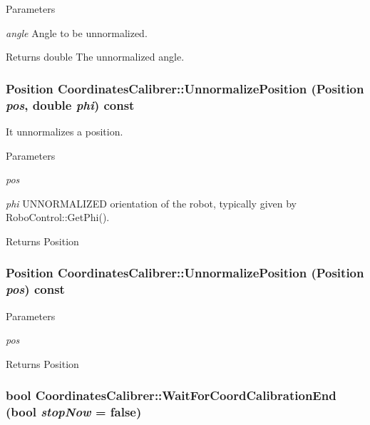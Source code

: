 \begin{DoxyParams}{Parameters}
\item[{\em angle}]Angle to be unnormalized. \end{DoxyParams}
\begin{DoxyReturn}{Returns}
double The unnormalized angle. 
\end{DoxyReturn}
\hypertarget{classCoordinatesCalibrer_a19035a69d4d571e5e1d4baa4ba10baee}{
\subsubsection[{UnnormalizePosition}]{\setlength{\rightskip}{0pt plus 5cm}Position CoordinatesCalibrer::UnnormalizePosition (Position {\em pos}, \/  double {\em phi}) const}}
\label{classCoordinatesCalibrer_a19035a69d4d571e5e1d4baa4ba10baee}


It unnormalizes a position. 


\begin{DoxyParams}{Parameters}
\item[{\em pos}]\item[{\em phi}]UNNORMALIZED orientation of the robot, typically given by RoboControl::GetPhi(). \end{DoxyParams}
\begin{DoxyReturn}{Returns}
Position 
\end{DoxyReturn}
\hypertarget{classCoordinatesCalibrer_a8522193b13196313d001c589e7845bd3}{
\subsubsection[{UnnormalizePosition}]{\setlength{\rightskip}{0pt plus 5cm}Position CoordinatesCalibrer::UnnormalizePosition (Position {\em pos}) const}}
\label{classCoordinatesCalibrer_a8522193b13196313d001c589e7845bd3}

\begin{DoxyParams}{Parameters}
\item[{\em pos}]\end{DoxyParams}
\begin{DoxyReturn}{Returns}
Position 
\end{DoxyReturn}
\hypertarget{classCoordinatesCalibrer_a99563ba6e43f839bf1b10f55cf155125}{
\subsubsection[{WaitForCoordCalibrationEnd}]{\setlength{\rightskip}{0pt plus 5cm}bool CoordinatesCalibrer::WaitForCoordCalibrationEnd (bool {\em stopNow} = {\ttfamily false})}}
\label{classCoordinatesCalibrer_a99563ba6e43f839bf1b10f55cf155125}


